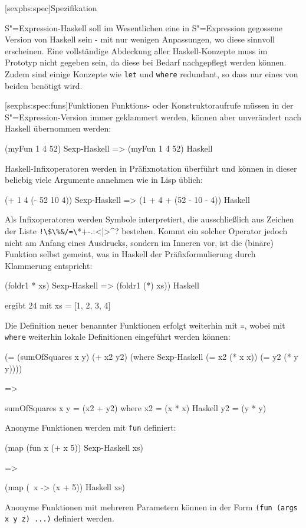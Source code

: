 \documentclass[11pt, a4paper, bibgerm]{scrbook}
\newcommand\icode[1]{\lstinline?#1?}
\newcommand\lsection{}
\newcommand\lsubsection{}
\newcommand{\sexp}{S"=Expression}
\begin{document}
\lsection[sexphs:spec]{Spezifikation}

\sexp{}-Haskell soll im Wesentlichen eine in \sexp{} gegossene Version
von Haskell sein - mit nur wenigen Anpassungen, wo diese sinnvoll
erscheinen. Eine vollständige Abdeckung aller Haskell-Konzepte muss im
Prototyp nicht gegeben sein, da diese bei Bedarf nachgepflegt werden
können. Zudem sind einige Konzepte wie \icode{let} und \icode{where}
redundant, so dass nur eines von beiden benötigt wird. 

\lsubsection[sexphs:spec:funs]{Funktionen}
Funktions- oder Konstruktoraufrufe müssen in der \sexp{}-Version immer
geklammert werden, können aber unverändert nach Haskell übernommen
werden:
\begin{code}
(myFun 1 4 52)              Sexp-Haskell
=>
(myFun 1 4 52)              Haskell
\end{code}
Haskell-Infixoperatoren werden in Präfixnotation überführt und können
in dieser beliebig viele Argumente annehmen wie in Lisp üblich:
\begin{code}
(+ 1 4 (- 52 10 4))         Sexp-Haskell
=>
(1 + 4 + (52 - 10 - 4))     Haskell
\end{code}
Als Infixoperatoren werden Symbole interpretiert, die ausschließlich
aus Zeichen der Liste \icode{!\$\%&/=\?*+-.:<|>^}
bestehen. Kommt ein solcher Operator jedoch nicht am Anfang eines
Ausdrucks, sondern im Inneren vor, ist die (binäre) Funktion selbst
gemeint, was in Haskell der Präfixformulierung durch Klammerung
entspricht:
\begin{code}
(foldr1 * xs)               Sexp-Haskell
=>
(foldr1 (*) xs))            Haskell

ergibt 24 mit xs = [1, 2, 3, 4]
\end{code}
Die Definition neuer benannter Funktionen erfolgt weiterhin mit
\icode{=}, wobei mit \icode{where} weiterhin lokale Definitionen
eingeführt werden können:
\begin{code}
(= (sumOfSquares x y)
   (+ x2 y2)
 (where                     Sexp-Haskell
  (= x2 (* x x))
  (= y2 (* y y))))

=>

sumOfSquares x y = (x2 + y2)
  where
    x2 = (x * x)            Haskell
    y2 = (y * y)
\end{code}
Anonyme Funktionen werden mit \icode{fun} definiert:
\begin{code}
(map 
  (fun x (+ x 5))           Sexp-Haskell
  xs)

=>

(map
  (\ x -> (x + 5))          Haskell
  xs)
\end{code}
Anonyme Funktionen mit mehreren Parametern können in der Form
\icode{(fun (args x y z) ...)} definiert werden.
\end{document}
